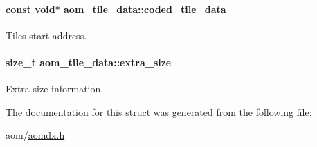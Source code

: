 \paragraph[{\texorpdfstring{coded\+\_\+tile\+\_\+data}{coded_tile_data}}]{\setlength{\rightskip}{0pt plus 5cm}const void$\ast$ aom\+\_\+tile\+\_\+data\+::coded\+\_\+tile\+\_\+data}\hypertarget{structaom__tile__data_a05898249ddaf5ba799dd471113b0e51e}{}\label{structaom__tile__data_a05898249ddaf5ba799dd471113b0e51e}
Tile\textquotesingle{}s start address. 
\paragraph[{\texorpdfstring{extra\+\_\+size}{extra_size}}]{\setlength{\rightskip}{0pt plus 5cm}size\+\_\+t aom\+\_\+tile\+\_\+data\+::extra\+\_\+size}\hypertarget{structaom__tile__data_a936851e515bcea0af38d2d091f5adf65}{}\label{structaom__tile__data_a936851e515bcea0af38d2d091f5adf65}
Extra size information. 

The documentation for this struct was generated from the following file\+:\begin{DoxyCompactItemize}
\item 
aom/\hyperlink{aomdx_8h}{aomdx.\+h}\end{DoxyCompactItemize}
